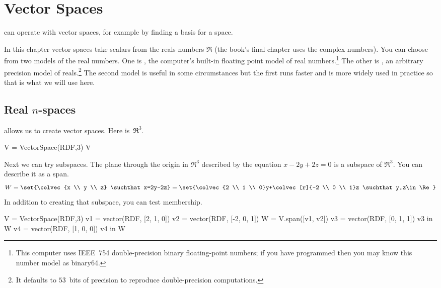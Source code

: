 \chapter{Vector Spaces}

\Sage{} can operate with vector spaces, for example by finding a basis for
a space.

In this chapter vector spaces take scalars from the reals numbers $\Re$
(the book's final chapter uses the complex numbers).
You can choose from two models of the real numbers.
One is , the computer's built-in floating point
model of real numbers.\footnote{This computer uses
IEEE~754 double-precision binary floating-point numbers;  
if you have programmed then you may know this number model as binary64.}  
The other is , an arbitrary precision model of 
reals.\footnote{It defaults to $53$~bits of precision to reproduce 
double-precision computations.}
The second model is useful in some circumstances but the first runs faster
and is more widely used in practice so that is what we will use here.
 




\section{Real $n$-spaces}

\Sage{} allows us to create vector spaces.
Here is~$\Re^3$.
\begin{sageoutput}
V = VectorSpace(RDF,3)
V
\end{sageoutput}

Next we can try subspaces.
The plane through the origin in $\Re^3$ described by the equation
$x-2y+2z=0$
is a subspace of $\Re^3$.
You can describe it as a span.
\begin{equation*}
  W=\set{\colvec{x \\ y \\ z}
    \suchthat x=2y-2z}
  =\set{\colvec{2 \\ 1 \\ 0}y+\colvec[r]{-2 \\ 0 \\ 1}z
        \suchthat y,z\in\Re}
\end{equation*}
In addition to creating that subspace,
you can test membership.
\begin{sageoutput}
V = VectorSpace(RDF,3) 
v1 = vector(RDF, [2, 1, 0])
v2 = vector(RDF, [-2, 0, 1])
W = V.span([v1, v2])
v3 = vector(RDF, [0, 1, 1])
v3 in W
v4 = vector(RDF, [1, 0, 0])
v4 in W
\end{sageoutput}

